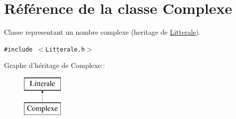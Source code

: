 \hypertarget{class_complexe}{
\section{Référence de la classe Complexe}
\label{class_complexe}
}
Classe representant un nombre complexe (heritage de \hyperlink{class_litterale}{Litterale}).  


{\tt \#include $<$Litterale.h$>$}

Graphe d'héritage de Complexe::\begin{figure}[H]
\begin{center}
\leavevmode
\includegraphics[height=2cm]{class_complexe}
\end{center}
\end{figure}

